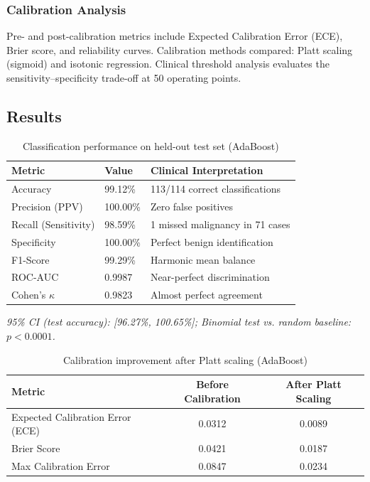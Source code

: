 \documentclass[11pt,a4paper]{article}
\begin{document}
\subsubsection{Calibration Analysis}

Pre- and post-calibration metrics include Expected Calibration Error (ECE), Brier score, and reliability curves. Calibration methods compared: Platt scaling (sigmoid) and isotonic regression. Clinical threshold analysis evaluates the sensitivity--specificity trade-off at 50 operating points.

\subsection{Results}

\begin{table}[H]
\centering
\caption{Classification performance on held-out test set (AdaBoost)}
\begin{tabular}{llp{5cm}}
\toprule
\textbf{Metric} & \textbf{Value} & \textbf{Clinical Interpretation} \\
\midrule
Accuracy & 99.12\% & 113/114 correct classifications \\
Precision (PPV) & 100.00\% & Zero false positives \\
Recall (Sensitivity) & 98.59\% & 1 missed malignancy in 71 cases \\
Specificity & 100.00\% & Perfect benign identification \\
F1-Score & 99.29\% & Harmonic mean balance \\
ROC-AUC & 0.9987 & Near-perfect discrimination \\
Cohen's $\kappa$ & 0.9823 & Almost perfect agreement \\
\bottomrule
\end{tabular}
\label{tab:bc_performance}
\end{table}

\noindent\textit{95\% CI (test accuracy): [96.27\%, 100.65\%]; Binomial test vs. random baseline: $p < 0.0001$.}

\begin{table}[H]
\centering
\caption{Calibration improvement after Platt scaling (AdaBoost)}
\begin{tabular}{lcc}
\toprule
\textbf{Metric} & \textbf{Before Calibration} & \textbf{After Platt Scaling} \\
\midrule
Expected Calibration Error (ECE) & 0.0312 & 0.0089 \\
Brier Score & 0.0421 & 0.0187 \\
Max Calibration Error & 0.0847 & 0.0234 \\
\bottomrule
\end{tabular}
\label{tab:calibration}
\end{table}
\end{document}
